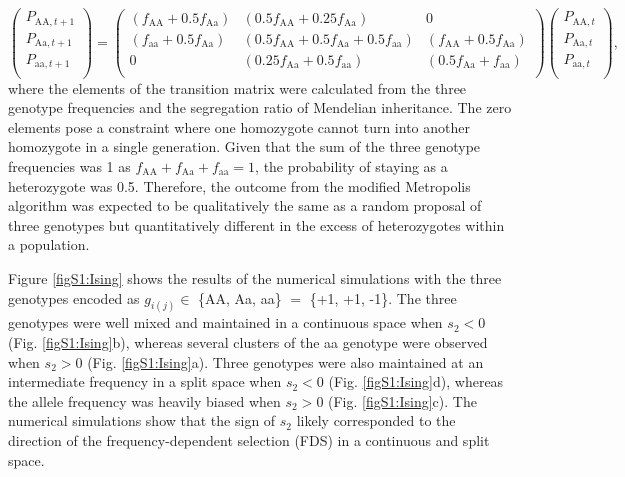 \documentclass[12pt,]{article}
\begin{document}
$$
\left( \begin{array}{cc} 
    P_{\mathrm{AA},t+1}\\ 
    P_{\mathrm{Aa},t+1}\\
    P_{\mathrm{aa},t+1}\\
    \end{array} \right) 
    =
\left(\begin{array}{ccc}
    (f_\mathrm{AA}+0.5f_\mathrm{Aa}) & (0.5f_\mathrm{AA}+0.25f_\mathrm{Aa}) & 0\\ 
    (f_\mathrm{aa}+0.5f_\mathrm{Aa}) & (0.5f_\mathrm{AA}+0.5f_\mathrm{Aa}+0.5f_\mathrm{aa}) & (f_\mathrm{AA}+0.5f_\mathrm{Aa})\\
    0 & (0.25f_\mathrm{Aa}+0.5f_\mathrm{aa}) & (0.5f_\mathrm{Aa}+f_\mathrm{aa})\\
    \end{array} \right) 
\left( \begin{array}{cc} 
    P_{\mathrm{AA},t}\\ 
    P_{\mathrm{Aa},t}\\
    P_{\mathrm{aa},t}\\
    \end{array} \right),
$$
\noindent
where the elements of the transition matrix were calculated from the three genotype frequencies and the segregation ratio of Mendelian inheritance. The zero elements pose a constraint where one homozygote cannot turn into another homozygote in a single generation. Given that the sum of the three genotype frequencies was 1 as $f_\mathrm{AA}+f_\mathrm{Aa}+f_\mathrm{aa}=1$, the probability of staying as a heterozygote was 0.5. Therefore, the outcome from the modified Metropolis algorithm was expected to be qualitatively the same as a random proposal of three genotypes but quantitatively different in the excess of heterozygotes within a population.

Figure \ref{figS1:Ising} shows the results of the numerical simulations with the three genotypes encoded as $g_{i(j)} \in$ \{AA, Aa, aa\} $=$ \{+1, +1, -1\}. The three genotypes were well mixed and maintained in a continuous space when $s_2<0$ (Fig. \ref{figS1:Ising}b), whereas several clusters of the aa genotype were observed when $s_2>0$ (Fig. \ref{figS1:Ising}a). Three genotypes were also maintained at an intermediate frequency in a split space when $s_2<0$ (Fig. \ref{figS1:Ising}d), whereas the allele frequency was heavily biased when $s_2>0$ (Fig. \ref{figS1:Ising}c). The numerical simulations show that the sign of $s_2$ likely corresponded to the direction of the frequency-dependent selection (FDS) in a continuous and split space.
\end{document}
